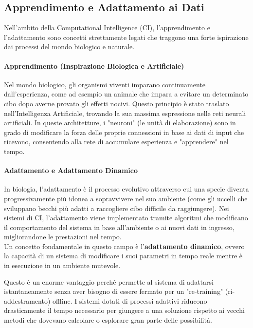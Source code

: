 \subsection{Apprendimento e Adattamento ai Dati}
Nell'ambito della Computational Intelligence (CI), l'apprendimento e l'adattamento 
sono concetti strettamente legati che traggono una forte ispirazione dai processi 
del mondo biologico e naturale.

\paragraph{Apprendimento (Inspirazione Biologica e Artificiale)} 
Nel mondo biologico, gli organismi viventi imparano continuamente dall'esperienza, 
come ad esempio un animale che impara a evitare un determinato cibo dopo averne 
provato gli effetti nocivi. Questo principio è stato traslato nell'Intelligenza Artificiale, 
trovando la sua massima espressione nelle reti neurali artificiali. 
In queste architetture, i "neuroni" (le unità di elaborazione) sono in grado di 
modificare la forza delle proprie connessioni in base ai dati di input che ricevono, 
consentendo alla rete di accumulare esperienza e "apprendere" nel tempo.
\paragraph{Adattamento e Adattamento Dinamico} 
In biologia, l'adattamento è il processo evolutivo attraverso cui una specie 
diventa progressivamente più idonea a sopravvivere nel suo ambiente 
(come gli uccelli che sviluppano becchi più adatti a raccogliere cibo difficile da 
raggiungere). Nei sistemi di CI, l'adattamento viene implementato tramite algoritmi 
che modificano il comportamento del sistema in base all'ambiente o ai nuovi dati in 
ingresso, migliorandone le prestazioni nel tempo.\\

Un concetto fondamentale in questo campo è l'\textbf{adattamento dinamico}, 
ovvero la capacità di un sistema di modificare i suoi parametri in tempo reale 
mentre è in esecuzione in un ambiente mutevole. 

Questo è un enorme vantaggio perché permette al sistema di adattarsi istantaneamente 
senza aver bisogno di essere fermato per un "re-training" (ri-addestramento) offline. 
I sistemi dotati di processi adattivi riducono drasticamente il tempo necessario per 
giungere a una soluzione rispetto ai vecchi metodi che dovevano calcolare o esplorare 
gran parte delle possibilità.

